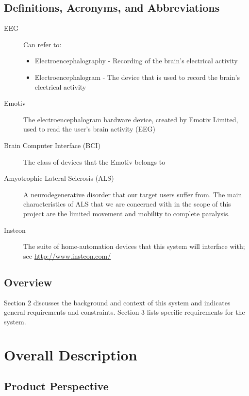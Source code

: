 \documentclass{article}
\begin{document}
\subsection{Definitions, Acronyms, and Abbreviations}

\begin{description}
    \item[EEG] Can refer to:
        \begin{itemize}
            \item Electroencephalography - Recording of the brain's electrical
                activity 
	        \item Electroencephalogram - The device that is used to record the
	            brain's electrical activity
        \end{itemize}
    \item[Emotiv] The electroencephalogram hardware device, created by Emotiv
        Limited, used to read the user's brain activity (EEG)
    \item[Brain Computer Interface (BCI)] The class of devices that the Emotiv
        belongs to
    \item[Amyotrophic Lateral Sclerosis (ALS)] A neurodegenerative disorder
        that our target users suffer from. The main characteristics of ALS
        that we are concerned with in the scope of this project are the
        limited movement and mobility to complete paralysis.
    \item[Insteon] The suite of home-automation devices that this system will
        interface with; see \url{http://www.insteon.com/}
\end{description}


\subsection{Overview}

Section 2 discusses the background and context of this system and indicates
general requirements and constraints. Section 3 lists specific requirements
for the system.

\newpage

\section{Overall Description}

\subsection{Product Perspective}
\end{document}
